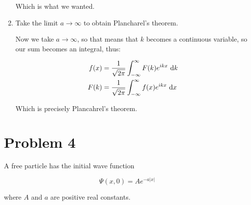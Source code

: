 \documentclass{article}
\begin{document}
\begin{enumerate}[label=(\alph*)]
\begin{solution}
        Which is what we wanted.
    \end{solution}
    
    \item Take the limit $a \to \infty$ to obtain Plancharel's theorem. 
    
    \begin{solution}
    Now we take $a \to \infty$, so that means that $k$ becomes a continuous variable, so our sum becomes an integral, thus:

    \begin{align*}
        f(x) &= \dfrac{1}{\sqrt{2\pi}}\int_{-\infty}^{\infty} F(k) e^{ikx} \ \mathrm d k\\
        F(k) &= \dfrac{1}{\sqrt{2\pi}}\int_{-\infty}^{\infty} f(x) e^{ikx} \ \mathrm d x
    \end{align*}

    Which is precisely Plancahrel's theorem.

\end{solution}
\end{enumerate}

\pagebreak 


\section*{Problem 4}

A free particle has the initial wave function 

\[ \Psi(x, 0) = Ae^{-a|x|}\] 

where $A$ and $a$ are positive real constants.
\end{document}
